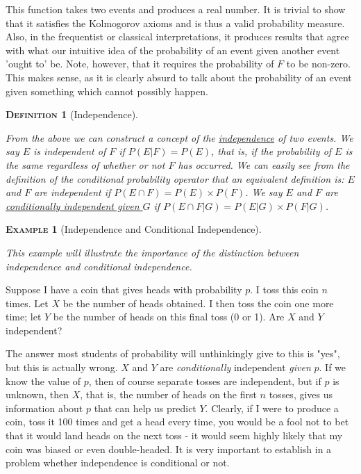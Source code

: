 \documentclass[12pt,a4paper]{article}
\newtheorem{definition}{\textsc{Definition}}[section]
\newtheorem{example}{\textsc{Example}}[section]
\begin{document}
This function takes two events and produces a real number. It is trivial to show that it satisfies the Kolmogorov axioms and is thus a valid probability measure. Also, in the frequentist or classical interpretations, it produces results that agree with what our intuitive idea of the probability of an event given another event 'ought to' be. Note, however, that it requires the probability of $F$ to be non-zero. This makes sense, as it is clearly absurd to talk about the probability of an event given something which cannot possibly happen.

\begin{definition}[Independence]$\;$\par
\vspace{12pt}

From the above we can construct a concept of the \underline{independence} of two events. We say $E$ is independent of $F$ if $P(E|F) = P(E)$, that is, if the probability of $E$ is the same regardless of whether or not $F$ has occurred. We can easily see from the definition of the conditional probability operator that an equivalent definition is: $E$ and $F$ are independent if $P(E \cap F) = P(E) \times P(F)$. We say $E$ and $F$ are \underline{conditionally independent given $G$} if $P(E \cap F | G) = P(E|G) \times P(F|G)$.
\end{definition}

\begin{example}[Independence and Conditional Independence]$\;$\par
\vspace{12pt}

This example will illustrate the importance of the distinction between independence and conditional independence.
\end{example}

Suppose I have a coin that gives heads with probability $p$. I toss this coin $n$ times. Let $X$ be the number of heads obtained. I then toss the coin one more time; let $Y$ be the number of heads on this final toss (0 or 1). Are $X$ and $Y$ independent?

The answer most students of probability will unthinkingly give to this is "yes", but this is actually wrong. $X$ and $Y$ are {\it conditionally} independent {\it given} $p$. If we know the value of $p$, then of course separate tosses are independent, but if $p$ is unknown, then $X$, that is, the number of heads on the first $n$ tosses, gives us information about $p$ that can help us predict $Y$. Clearly, if I were to produce a coin, toss it 100 times and get a head every time, you would be a fool not to bet that it would land heads on the next toss - it would seem highly likely that my coin was biased or even double-headed. It is very important to establish in a problem whether independence is conditional or not.
\end{document}
